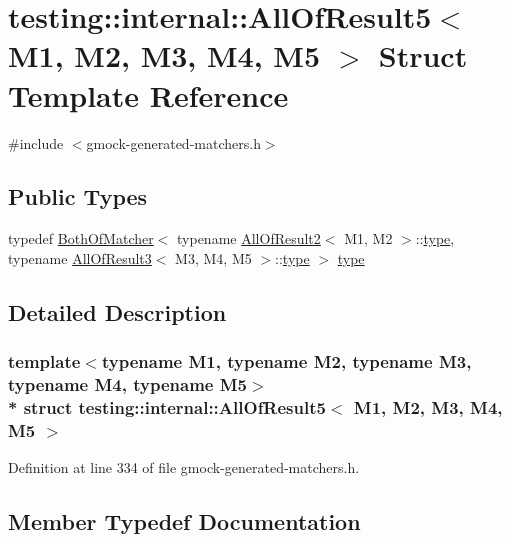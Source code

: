 \hypertarget{structtesting_1_1internal_1_1_all_of_result5}{}\section{testing\+:\+:internal\+:\+:All\+Of\+Result5$<$ M1, M2, M3, M4, M5 $>$ Struct Template Reference}
\label{structtesting_1_1internal_1_1_all_of_result5}


{\ttfamily \#include $<$gmock-\/generated-\/matchers.\+h$>$}

\subsection*{Public Types}
\begin{DoxyCompactItemize}
\item 
typedef \hyperlink{classtesting_1_1internal_1_1_both_of_matcher}{Both\+Of\+Matcher}$<$ typename \hyperlink{structtesting_1_1internal_1_1_all_of_result2}{All\+Of\+Result2}$<$ M1, M2 $>$\+::\hyperlink{structtesting_1_1internal_1_1_all_of_result5_aee2e1fb803f428741d147347b692d108}{type}, typename \hyperlink{structtesting_1_1internal_1_1_all_of_result3}{All\+Of\+Result3}$<$ M3, M4, M5 $>$\+::\hyperlink{structtesting_1_1internal_1_1_all_of_result5_aee2e1fb803f428741d147347b692d108}{type} $>$ \hyperlink{structtesting_1_1internal_1_1_all_of_result5_aee2e1fb803f428741d147347b692d108}{type}
\end{DoxyCompactItemize}


\subsection{Detailed Description}
\subsubsection*{template$<$typename M1, typename M2, typename M3, typename M4, typename M5$>$\\*
struct testing\+::internal\+::\+All\+Of\+Result5$<$ M1, M2, M3, M4, M5 $>$}



Definition at line 334 of file gmock-\/generated-\/matchers.\+h.



\subsection{Member Typedef Documentation}
